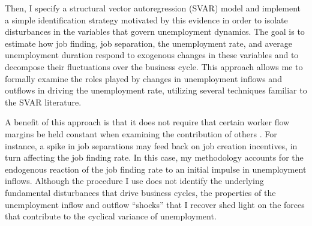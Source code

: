 \documentclass[12pt]{article}
\begin{document}
Then, I specify a structural vector autoregression (SVAR) model and implement a simple identification strategy motivated by this evidence in order to isolate disturbances in the variables that govern unemployment dynamics. The goal is to estimate how job finding, job separation, the unemployment rate, and average unemployment duration respond to exogenous changes in these variables and to decompose their fluctuations over the business cycle. This approach allows me to formally examine the roles played by changes in unemployment inflows and outflows in driving the unemployment rate, utilizing several techniques familiar to the SVAR literature.

A benefit of this approach is that it does not require that certain worker flow margins be held constant when examining the contribution of others \citep{Shimer:2012aa}. For instance, a spike in job separations may feed back on job creation incentives, in turn affecting the job finding rate. In this case, my methodology accounts for the endogenous reaction of the job finding rate to an initial impulse in unemployment inflows. Although the procedure I use does not identify the underlying fundamental disturbances that drive business cycles, the properties of the unemployment inflow and outflow ``shocks'' that I recover shed light on the forces that contribute to the cyclical variance of unemployment.
\end{document}
